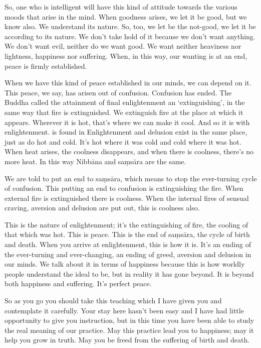 So, one who is intelligent will have this kind of attitude towards the various moods that arise in the mind. When goodness arises, we let it be good, but we know also. We understand its nature. So, too, we let be the not-good, we let it be according to its nature. We don't take hold of it because we don't want anything. We don't want evil, neither do we want good. We want neither heaviness nor lightness, happiness nor suffering. When, in this way, our wanting is at an end, peace is firmly established.

When we have this kind of peace established in our minds, we can depend on it. This peace, we say, has arisen out of confusion. Confusion has ended. The Buddha called the attainment of final enlightenment an `extinguishing', in the same way that fire is extinguished. We extinguish fire at the place at which it appears. Wherever it is hot, that's where we can make it cool. And so it is with enlightenment.  is found in  Enlightenment and delusion exist in the same place, just as do hot and cold. It's hot where it was cold and cold where it was hot. When heat arises, the coolness disappears, and when there is coolness, there's no more heat. In this way Nibb\=ana and sa\d{m}s\=ara are the same.

We are told to put an end to sa\d{m}s\=ara, which means to stop the ever-turning cycle of confusion. This putting an end to confusion is extinguishing the fire. When external fire is extinguished there is coolness. When the internal fires of sensual craving, aversion and delusion are put out, this is coolness also.

This is the nature of enlightenment; it's the extinguishing of fire, the cooling of that which was hot. This is peace. This is the end of sa\d{m}s\=ara, the cycle of birth and death. When you arrive at enlightenment, this is how it is. It's an ending of the ever-turning and ever-changing, an ending of greed, aversion and delusion in our minds. We talk about it in terms of happiness because this is how worldly people understand the ideal to be, but in reality it has gone beyond. It is beyond both happiness and suffering. It's perfect peace.

So as you go you should take this teaching which I have given you and contemplate it carefully. Your stay here hasn't been easy and I have had little opportunity to give you instruction, but in this time you have been able to study the real meaning of our practice. May this practice lead you to happiness; may it help you grow in truth. May you be freed from the suffering of birth and death.

